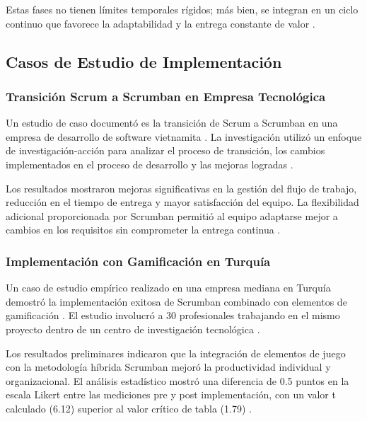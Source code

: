 \documentclass[conference]{IEEEtran}
\begin{document}
Estas fases no tienen límites temporales rígidos; más bien, se integran en un ciclo continuo que favorece la adaptabilidad y la entrega constante de valor \cite{atlassian_scrumban, sixsigma_scrumban}.

\subsection{Casos de Estudio de Implementación}

\subsubsection{Transición Scrum a Scrumban en Empresa Tecnológica}

Un estudio de caso documentó es la transición de Scrum a Scrumban en una empresa de desarrollo de software vietnamita \cite{scrum_to_scrumban_2012}. La investigación utilizó un enfoque de investigación-acción para analizar el proceso de transición, los cambios implementados en el proceso de desarrollo y las mejoras logradas \cite{scrum_to_scrumban_2012}.

Los resultados mostraron mejoras significativas en la gestión del flujo de trabajo, reducción en el tiempo de entrega y mayor satisfacción del equipo. La flexibilidad adicional proporcionada por Scrumban permitió al equipo adaptarse mejor a cambios en los requisitos sin comprometer la entrega continua \cite{scrum_to_scrumban_2012}.

\subsubsection{Implementación con Gamificación en Turquía}

Un caso de estudio empírico realizado en una empresa mediana en Turquía demostró la implementación exitosa de Scrumban combinado con elementos de gamificación \cite{yilmaz_gamification_2016}. El estudio involucró a 30 profesionales trabajando en el mismo proyecto dentro de un centro de investigación tecnológica \cite{yilmaz_gamification_2016}.

Los resultados preliminares indicaron que la integración de elementos de juego con la metodología híbrida Scrumban mejoró la productividad individual y organizacional. El análisis estadístico mostró una diferencia de 0.5 puntos en la escala Likert entre las mediciones pre y post implementación, con un valor t calculado (6.12) superior al valor crítico de tabla (1.79) \cite{yilmaz_gamification_2016}.
\end{document}

